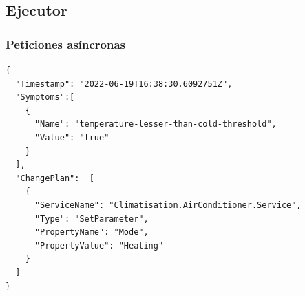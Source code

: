 \subsection{Ejecutor}

\subsubsection{Peticiones asíncronas}

\newsavebox\executechangeplanrequestbox
\begin{lrbox}{\executechangeplanrequestbox}
  \begin{minipage}[t]{2in}
    \begin{verbatim}
{
  "Timestamp": "2022-06-19T16:38:30.6092751Z",
  "Symptoms":[
    {
      "Name": "temperature-lesser-than-cold-threshold",
      "Value": "true"
    }
  ],
  "ChangePlan":  [
    {
      "ServiceName": "Climatisation.AirConditioner.Service",
      "Type": "SetParameter",
      "PropertyName": "Mode",
      "PropertyValue": "Heating"
    }
  ]
}
        \end{verbatim}
  \end{minipage}
\end{lrbox}

